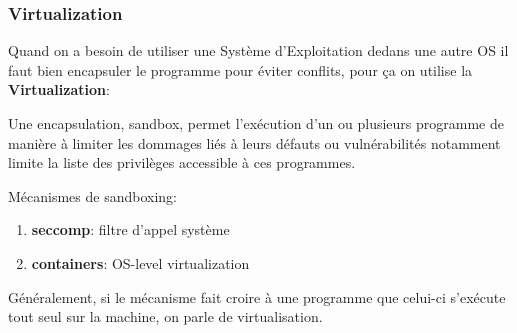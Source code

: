 \documentclass{article}
\begin{document}
\subsubsection{Virtualization}
Quand on a besoin de utiliser une Système d'Exploitation dedans une autre OS il faut bien encapsuler le programme pour éviter conflits, pour ça on utilise la \textbf{Virtualization}:
\begin{definition}
    Une encapsulation, sandbox, permet l'exécution d'un ou plusieurs programme de manière à limiter les dommages liés à leurs défauts ou vulnérabilités notamment limite la liste des privilèges accessible à ces programmes.
\end{definition}
Mécanismes de sandboxing:
\begin{enumerate}[noitemsep]
    \item \textbf{seccomp}: filtre d'appel système
    \item \textbf{containers}: OS-level virtualization
\end{enumerate}
Généralement, si le mécanisme fait croire à une programme que celui-ci s'exécute tout seul sur la machine, on parle de virtualisation.
\end{document}

